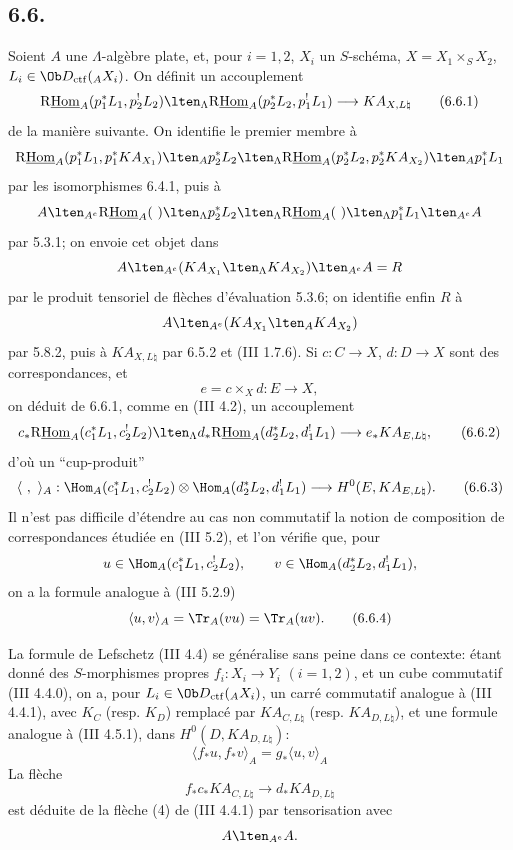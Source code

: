 \subsection*{6.6.}
Soient $A$ une $\Lambda$-algèbre plate, et, pour $i=1,2$, $X_i$ un $S$-schéma, $X=X_1\times_SX_2$, $L_i\in\Ob D_{\mathrm{ctf}}({}_AX_i)$. On définit un accouplement
\begin{equation}
\mathrm{R}\underline{\mathrm{Hom}}_A(p_1^*L_1,p_2^!L_2)
\lten_{\Lambda}
\mathrm{R}\underline{\mathrm{Hom}}_A(p_2^*L_2,p_1^!L_1)
\longrightarrow
KA_{X,L\natural}
\tag{6.6.1}
\end{equation}
de la manière suivante. On identifie le premier
membre à
\[
\mathrm{R}\underline{\mathrm{Hom}}_A(p_1^*L_1,p_1^*KA_{X_1})
\lten_A p_2^*L_2
\lten_{\Lambda}
\mathrm{R}\underline{\mathrm{Hom}}_A(p_2^*L_2,p_2^*KA_{X_2})
\lten_A p_1^*L_1
\]
par les isomorphismes 6.4.1, puis à
\[
A\lten_{A^e}\mathrm{R}\underline{\mathrm{Hom}}_A(\ )\lten_{\Lambda}p_2^*L_2
 \lten_{\Lambda}\mathrm{R}\underline{\mathrm{Hom}}_A(\ )\lten_{\Lambda}p_1^*L_1\lten_{A^e}A
\]
par 5.3.1; on envoie cet objet dans
\[
A\lten_{A^e}(KA_{X_1}\lten_{\Lambda}KA_{X_2})\lten_{A^e}A=R
\]
par le produit tensoriel de flèches d'évaluation 5.3.6; on identifie enfin $R$ à
\[
A\lten_{A^e}(KA_{X_1}\lten_A KA_{X_2})
\]
par 5.8.2, puis à $KA_{X,L\natural}$ par 6.5.2 et (III 1.7.6). Si $c:C\to X$, $d:D\to X$ sont des correspondances, et
\[
e=c\times_Xd:E\to X,
\]
on déduit de 6.6.1, comme en (III 4.2), un accouplement
\begin{equation}
c_*\mathrm{R}\underline{\mathrm{Hom}}_A(c_1^*L_1,c_2^!L_2)
\lten_{\Lambda}
d_*\mathrm{R}\underline{\mathrm{Hom}}_A(d_2^*L_2,d_1^!L_1)
\longrightarrow
e_*KA_{E,L\natural},
\tag{6.6.2}
\end{equation}
d'où un ``cup-produit''
\begin{equation}
\langle\ ,\ \rangle_A:
\Hom_A(c_1^*L_1,c_2^!L_2)\otimes
\Hom_A(d_2^*L_2,d_1^!L_1)
\longrightarrow
H^0(E,KA_{E,L\natural}).
\tag{6.6.3}
\end{equation}
Il n'est pas difficile d'étendre au cas non commutatif la notion de composition de correspondances étudiée en (III 5.2), et l'on vérifie que, pour
\[
u\in\Hom_A(c_1^*L_1,c_2^!L_2),\qquad
v\in\Hom_A(d_2^*L_2,d_1^!L_1),
\]
on a la formule analogue à (III 5.2.9)
\begin{equation}
\langle u,v\rangle_A=\Tr_A(vu)=\Tr_A(uv).
\tag{6.6.4}
\end{equation}

La formule de Lefschetz (III 4.4) se généralise sans peine dans ce contexte: étant donné des $S$-morphismes propres $f_i:X_i\to Y_i$ $(i=1,2)$, et un cube commutatif (III 4.4.0), on a, pour $L_i\in\Ob D_{\mathrm{ctf}}({}_AX_i)$, un carré commutatif analogue à (III 4.4.1), avec $K_C$ (resp. $K_D$) remplacé par $KA_{C,L\natural}$ (resp. $KA_{D,L\natural}$), et une formule analogue à (III 4.5.1), dans $H^0(D,KA_{D,L\natural})$:
\begin{equation}
\langle f_*u,f_*v\rangle_A=g_*\langle u,v\rangle_A
\tag{6.6.5}
\end{equation}
La flèche
\[
f_*c_*KA_{C,L\natural}\longrightarrow d_*KA_{D,L\natural}
\]
est déduite de la flèche (4) de (III 4.4.1) par tensorisation avec
\[
A\lten_{A^e}A .
\]

